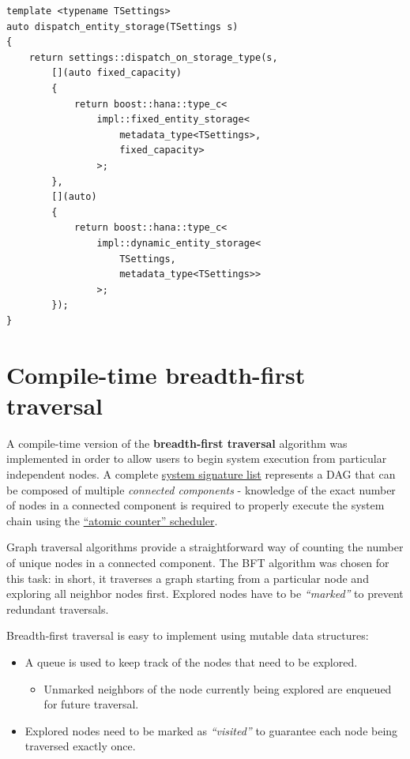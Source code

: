 \documentclass[twoside, 12pt, a4paper, openany]{book}
\providecommand{\tightlist}{%
  \setlength{\itemsep}{0pt}\setlength{\parskip}{0pt}}
\begin{document}
\begin{verbatim}
template <typename TSettings>
auto dispatch_entity_storage(TSettings s)
{
    return settings::dispatch_on_storage_type(s,
        [](auto fixed_capacity)
        {
            return boost::hana::type_c<
                impl::fixed_entity_storage<
                    metadata_type<TSettings>,
                    fixed_capacity>
                >;
        },
        [](auto)
        {
            return boost::hana::type_c<
                impl::dynamic_entity_storage<
                    TSettings,
                    metadata_type<TSettings>>
                >;
        });
}
\end{verbatim}

\hypertarget{appendix_compiletime_bfs}{\section{Compile-time
breadth-first traversal}\label{appendix_compiletime_bfs}}

A compile-time version of the \textbf{breadth-first traversal} algorithm
was implemented in order to allow users to begin system execution from
particular independent nodes. A complete
\protect\hyperlink{ctopts_siglist}{system signature list} represents a
DAG that can be composed of multiple \emph{connected components} -
knowledge of the exact number of nodes in a connected component is
required to properly execute the system chain using the
\protect\hyperlink{mt_ac_scheduler}{``atomic counter'' scheduler}.

Graph traversal algorithms provide a straightforward way of counting the
number of unique nodes in a connected component. The BFT algorithm was
chosen for this task: in short, it traverses a graph starting from a
particular node and exploring all neighbor nodes first. Explored nodes
have to be \emph{``marked''} to prevent redundant traversals.

Breadth-first traversal is easy to implement using mutable data
structures:

\begin{itemize}
\item
  A queue is used to keep track of the nodes that need to be explored.

  \begin{itemize}
  \tightlist
  \item
    Unmarked neighbors of the node currently being explored are enqueued
    for future traversal.
  \end{itemize}
\item
  Explored nodes need to be marked as \emph{``visited''} to guarantee
  each node being traversed exactly once.
\end{itemize}
\end{document}
